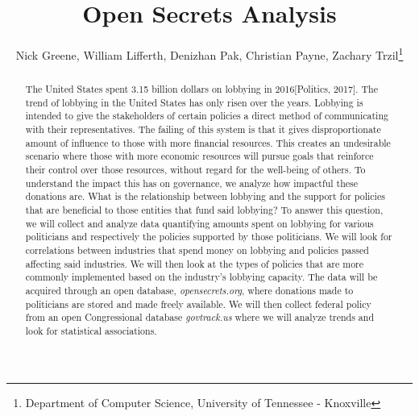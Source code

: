 \documentclass[journal]{IEEEtran}
\begin{document}
\title{Open Secrets Analysis}

\author{Nick Greene, William Lifferth, Denizhan Pak, Christian Payne, Zachary Trzil\thanks{Department of Computer Science, University of Tennessee - Knoxville}} \maketitle


\begin{abstract}
  The United States spent 3.15 billion dollars on lobbying in 2016[Politics, 2017]. The trend of lobbying in the United States 
  has only risen over the years. Lobbying is intended to give the stakeholders of certain policies a direct method 
  of communicating with their representatives. The failing of this system is that it gives disproportionate amount 
  of influence to those with more financial resources. This creates an undesirable scenario where those with more 
  economic resources will pursue goals that reinforce their control over those resources, without regard for the 
  well-being of others. To understand the impact this has on governance, we analyze how impactful these donations 
  are. What is the relationship between lobbying and the support for policies that are beneficial to those entities 
  that fund said lobbying? To answer this question, we will collect and analyze data quantifying amounts spent on 
  lobbying for various politicians and respectively the policies supported by those politicians. We will look for 
  correlations between industries that spend money on lobbying and policies passed affecting said industries. We 
  will then look at the types of policies that are more commonly implemented based on the industry's lobbying 
  capacity. The data will be acquired through an open database, \textit{opensecrets.org}, where donations made to 
  politicians are stored and made freely available. We will then collect federal policy from an open Congressional 
  database \textit{govtrack.us} where we will analyze trends and look for statistical associations.
\end{abstract}
\end{document}
